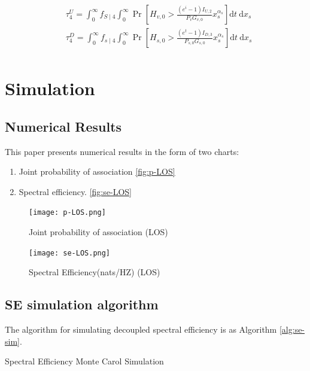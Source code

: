 \documentclass[conference]{IEEEtran}
\begin{document}
\begin{CJK*}{UTF8}{bsmi}
\begin{equation}
\begin{aligned}
& \tau_4^U=\int_0^{\infty} f_{S \mid 4} \int_0^{\infty} \operatorname{Pr}\left[H_{v, 0}>\frac{\left(e^i-1\right) I_{U, 2}}{P_v G_{v, 0}} x_s^{\alpha_s}\right] \mathrm{d} t \mathrm{~d} x_s \\
& \tau_4^D=\int_0^{\infty} f_{s \mid 4} \int_0^{\infty} \operatorname{Pr}\left[H_{s, 0}>\frac{\left(e^t-1\right) I_{D, 3}}{P_{s, 0} G_{s, 0}} x_s^{\alpha_s}\right] \mathrm{d} t \mathrm{~d} x_s \\
&
\end{aligned}
\end{equation}

\section{Simulation}
\subsection{Numerical Results}
This paper presents numerical results in the form of two charts: 
\begin{enumerate}
\item Joint probability of association \autoref{fig:p-LOS}
\item Spectral efficiency. \autoref{fig:se-LOS}
\end{enumerate}

\begin{figure}[htbp]
\centering
\texttt{[image: p-LOS.png]}
\caption{\label{fig:p-LOS}Joint probability of association (LOS)}
\end{figure}

\begin{figure}[htbp]
\centering
\texttt{[image: se-LOS.png]}
\caption{\label{fig:se-LOS}Spectral Efficiency(nats/HZ) (LOS)}
\end{figure}

\subsection{SE simulation algorithm}
The algorithm for simulating decoupled spectral efficiency is as Algorithm \ref{alg:se-sim}.
\begin{algorithm}[H] 
\caption{Spectral Efficiency Monte Carol Simulation}
\label{alg:se-sim}
\begin{algorithmic}[1]


\end{algorithmic}
\end{algorithm}
\end{CJK*}
\end{document}
